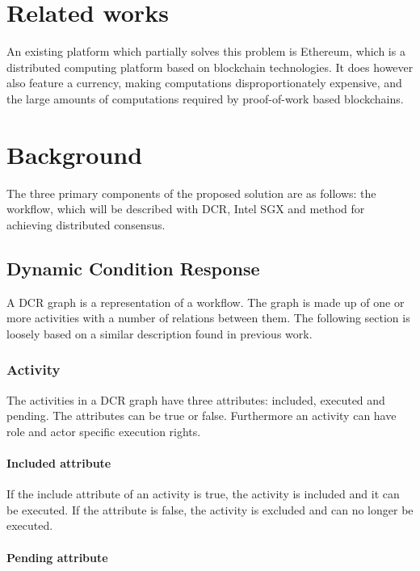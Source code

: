 \documentclass{article}
\begin{document}
	\section{Related works}

	An existing platform which partially solves this problem is Ethereum\cite{ethereum-white-paper}, which is a distributed computing platform based on blockchain technologies.
	It does however also feature a currency, making computations disproportionately expensive, and the large amounts of computations required by proof-of-work based blockchains.

	\section{Background}

	The three primary components of the proposed solution are as follows: the workflow, which will be described with DCR, Intel SGX and method for achieving distributed consensus.

		\subsection{Dynamic Condition Response}

		A DCR graph is a representation of a workflow.
		The graph is made up of one or more activities with a number of relations between them. 
		The following section is loosely based on a similar description found in previous work\cite{dcreum}.

		\subsubsection{Activity}

		The activities in a DCR graph have three attributes: included, executed and pending. 
		The attributes can be true or false. 
		Furthermore an activity can have role and actor specific execution rights.

			\paragraph{Included attribute}

			If the include attribute of an activity is true, the activity is included and it can be executed. 
			If the attribute is false, the activity is excluded and can no longer be executed.

			\paragraph{Pending attribute}
\end{document}
